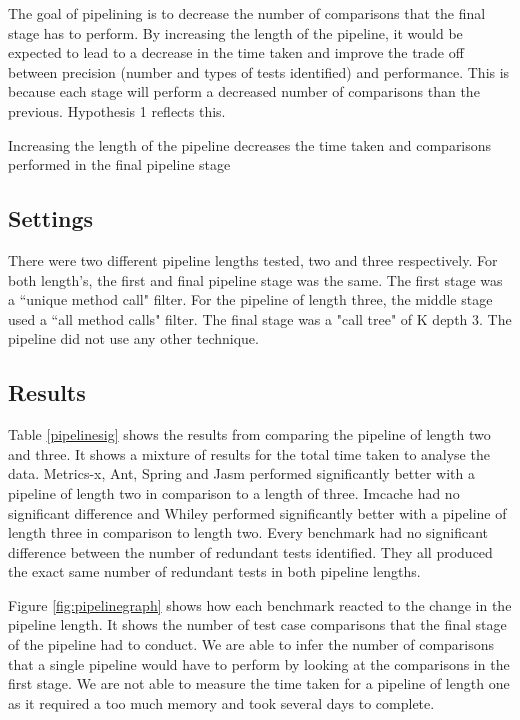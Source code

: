 The goal of pipelining is to decrease the number of comparisons that the final stage has to perform. By increasing the length of the pipeline, it would be expected to lead to a decrease in the time taken and improve the trade off between precision (number and types of tests identified) and performance. This is because each stage will perform a decreased number of comparisons than the previous. Hypothesis 1 reflects this.

\begin{hyp}
Increasing the length of the pipeline decreases the time taken and comparisons performed in the final pipeline stage
\end{hyp}

\subsection{Settings}
There were two different pipeline lengths tested, two and three respectively. For both length's, the first and final pipeline stage was the same. The first stage was a ``unique method call" filter. For the pipeline of length three, the middle stage used a ``all method calls" filter. The final stage was a "call tree" of K depth 3. The pipeline did not use any other technique.

\subsection{Results}

Table \ref{pipelinesig} shows the results from comparing the pipeline of length two and three. It shows a mixture of results for the total time taken to analyse the data. Metrics-x, Ant, Spring and Jasm performed significantly better with a pipeline of length two in comparison to a length of three. Imcache had no significant difference and Whiley performed significantly better with a pipeline of length three in comparison to length two. Every benchmark had no significant difference between the number of redundant tests identified. They all produced the exact same number of redundant tests in both pipeline lengths.

Figure \ref{fig:pipelinegraph} shows how each benchmark reacted to the change in the pipeline length. It shows the number of test case comparisons that the final stage of the pipeline had to conduct. We are able to infer the number of comparisons that a single pipeline would have to perform by looking at the comparisons in the first stage.  We are not able to measure the time taken for a pipeline of length one as it required a too much memory and took several days to complete.

